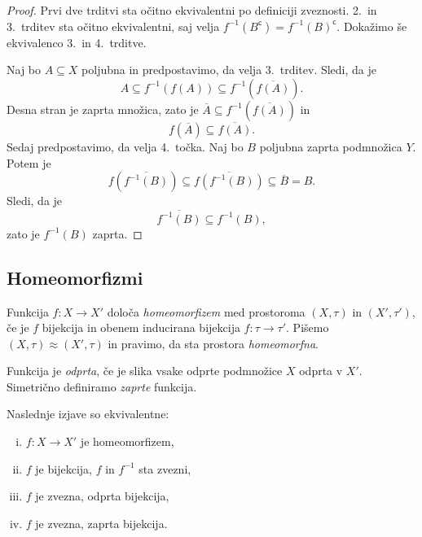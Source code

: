 \begin{proof}
Prvi dve trditvi sta očitno ekvivalentni po definiciji zveznosti.
2.\ in 3.\ trditev sta očitno ekvivalentni, saj velja
$f^{-1}(B^\mathsf{c}) = f^{-1}(B)^\mathsf{c}$. Dokažimo še
ekvivalenco 3.\ in 4.\ trditve.

Naj bo $A\subseteq X$ poljubna in predpostavimo, da velja 3.\
trditev. Sledi, da je
\[
A \subseteq f^{-1}(f(A)) \subseteq f^{-1}(\overline{f(A)}).
\]
Desna stran je zaprta množica, zato je
$\overline{A} \subseteq f^{-1}(\overline{f(A)})$ in
\[
f(\overline{A}) \subseteq \overline{f(A)}.
\]
Sedaj predpostavimo, da velja 4.\ točka. Naj bo $B$ poljubna zaprta
podmnožica $Y$. Potem je
\[
f(\overline{f^{-1}(B)}) \subseteq \overline{f(f^{-1}(B))}
\subseteq \overline{B} = B.
\]
Sledi, da je
\[
\overline{f^{-1}(B)} \subseteq f^{-1}(B),
\]
zato je $f^{-1}(B)$ zaprta.
\end{proof}

\newpage

\subsection{Homeomorfizmi}


\begin{okvir}
\begin{definicija}
Funkcija $f \colon X \to X'$ določa
\emph{homeomorfizem}
med prostoroma $(X,\tau)$ in $(X',\tau')$, če je $f$
bijekcija in obenem inducirana bijekcija
$f \colon \tau \to \tau'$. Pišemo
$(X,\tau) \approx (X',\tau)$ in pravimo, da sta
prostora \emph{homeomorfna}.
\end{definicija}
\end{okvir}

\begin{definicija}
Funkcija je \emph{odprta}, če je
slika vsake odprte podmnožice $X$ odprta v $X'$. Simetrično
definiramo \emph{zaprte} funkcija.
\end{definicija}

\begin{trditev}
Naslednje izjave so ekvivalentne:

\begin{enumerate}[i)]
\item $f \colon X \to X'$ je homeomorfizem,
\item $f$ je bijekcija, $f$ in $f^{-1}$ sta zvezni,
\item $f$ je zvezna, odprta bijekcija,
\item $f$ je zvezna, zaprta bijekcija.
\end{enumerate}
\end{trditev}

